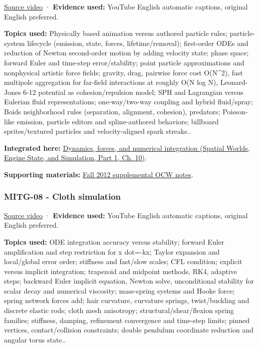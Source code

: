 \href{https://www.youtube.com/watch?v=-PGuhbZ2khE}{Source video} · \textbf{Evidence used:} YouTube English automatic captions, original English preferred.

\textbf{Topics used:} Physically based animation versus authored particle rules; particle-system lifecycle (emission, state, forces, lifetime/removal); first-order ODEs and reduction of Newton second-order motion by adding velocity state; phase space; forward Euler and time-step error/stability; point particle approximations and nonphysical artistic force fields; gravity, drag, pairwise force cost O(N\^{}2), fast multipole aggregation for far-field interactions at roughly O(N log N), Leonard-Jones 6-12 potential as cohesion/repulsion model; SPH and Lagrangian versus Eulerian fluid representations; one-way/two-way coupling and hybrid fluid/spray; Boids neighborhood rules (separation, alignment, cohesion), predators; Poisson-like emission, particle editors and spline-authored behaviors; billboard sprites/textured particles and velocity-aligned spark streaks..

\textbf{Integrated here:} \href{../05-Spatial-Worlds-Engine-State-and-Simulation-P01/main.pdf\#nameddest=04-visual-computing-ii-ch029-dynamics-forces-and-numerical-integration}{Dynamics, forces, and numerical integration (Spatial Worlds, Engine State, and Simulation, Part 1, Ch. 10)}.

\textbf{Supporting materials:} \href{https://ocw.mit.edu/courses/6-837-computer-graphics-fall-2012/pages/lecture-notes/}{Fall 2012 supplemental OCW notes}.

\subsubsection{MITG-08 - Cloth simulation}\label{04-visual-computing-ii-ch036-mitg-08---cloth-simulation}

\hypertarget{04-visual-computing-ii-ch036-mitg-08---cloth-simulation}{}

\href{https://www.youtube.com/watch?v=PJ8VzufNZ8o}{Source video} · \textbf{Evidence used:} YouTube English automatic captions, original English preferred.

\textbf{Topics used:} ODE integration accuracy versus stability; forward Euler amplification and step restriction for x dot=-kx; Taylor expansion and local/global error order; stiffness and fast/slow scales; CFL condition; explicit versus implicit integration; trapezoid and midpoint methods, RK4, adaptive steps; backward Euler implicit equation, Newton solve, unconditional stability for scalar decay and numerical viscosity; mass-spring systems and Hooke force; spring network forces add; hair curvature, curvature springs, twist/buckling and discrete elastic rods; cloth mesh anisotropy; structural/shear/flexion spring families; stiffness, damping, refinement convergence and time-step limits; pinned vertices, contact/collision constraints; double pendulum coordinate reduction and angular torus state..

